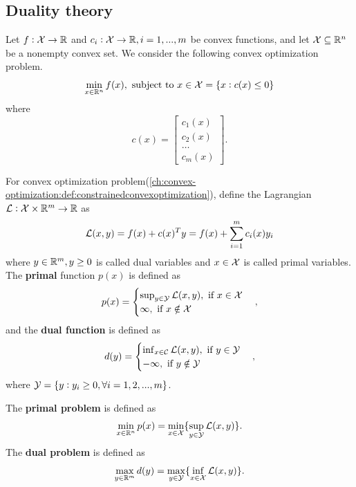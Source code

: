\begin{refsection}
\section{Duality theory}
\begin{definition}\label{ch:convex-optimization:def:constrainedconvexoptimization}
Let $f:\mathcal{X} \to \mathbb{R}$ and $c_i:\mathcal{X}\to \mathbb{R}, i=1,...,m$ be convex functions, and let $\mathcal{X}\subseteq \mathbb{R}^n$ be a nonempty convex set. We consider the following convex optimization problem.
$$\min_{x\in \mathbb{R}^n} f(x), ~\text{subject to}~ x\in \mathcal{X} = \{x: c(x)\leq 0 \}$$
where
$$c(x) = \begin{bmatrix}
c_1(x)\\
c_2(x)\\
\dots\\
c_m(x)
\end{bmatrix}.$$
\end{definition}


\begin{definition}
For convex optimization problem(\autoref{ch:convex-optimization:def:constrainedconvexoptimization}), define the Lagrangian $\mathcal{L}:\mathcal{X}\times \mathbb{R}^m \to \mathbb{R}$ as
$$\mathcal{L}(x,y) = f(x) + c(x)^Ty = f(x) + \sum_{i=1}^m c_i(x)y_i $$
where $y\in\mathbb{R}^m , y\geq 0$ is called dual variables and $x\in \mathcal{X}$ is called primal variables. 
The \textbf{primal} function $p(x)$ is defined as
$$p(x) = \begin{cases}
\sup_{y\in \mathcal{Y}} \mathcal{L}(x,y), ~\text{if}~ x\in \mathcal{X}\\
\infty, ~\text{if}~ x\notin \mathcal{X}
\end{cases},$$
and the \textbf{dual function} is defined as
$$d(y) = \begin{cases}
\inf_{x\in \mathcal{C}} \mathcal{L}(x,y), ~\text{if}~ y\in \mathcal{Y}\\
-\infty, ~\text{if}~ y\notin \mathcal{Y}
\end{cases},$$
where $\mathcal{Y} =\{y:y_i\geq 0, \forall i=1,2,...,m\}$.
\end{definition}


\begin{definition}\label{ch:convex-analysis:def:PrimalAndDualProblem}
The \textbf{primal problem} is defined as
$$\min_{x\in \mathbb{R}^n} p(x) = \min_{x\in \mathcal{X}} \{\sup_{y\in \mathcal{Y}} \mathcal{L}(x,y)\}.$$	
The \textbf{dual problem} is defined as
$$\max_{y\in \mathbb{R}^m} d(y) = \max_{y\in \mathcal{Y}} \{\inf_{x\in \mathcal{X}} \mathcal{L}(x,y)\}.$$	
\end{definition}



\end{refsection}
